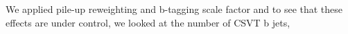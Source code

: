 
We applied pile-up reweighting and b-tagging scale factor and to see that these 
effects are under control, we looked at the number of CSVT b jets,


